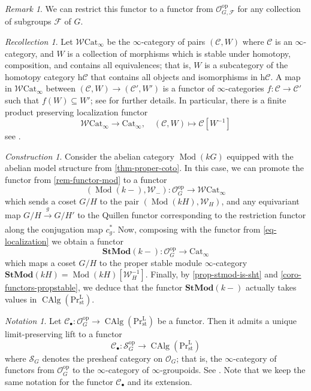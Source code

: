 \documentclass{amsart}
\newcommand{\nameop}{\operatorname{op}\nolimits}
\def \C{{\mathcal C}}
\def \F{{\mathcal F}}
\def \O{{\mathcal O}}
\def \S{{\mathcal S}}
\def \W{{\mathcal W}}
\def \PrL{\mathrm{Pr}^{\mathrm{L}}_{\mathrm{st}}}
\DeclareMathOperator{\Mod}{Mod}
\DeclareMathOperator{\CAlg}{CAlg}
\numberwithin{equation}{section}%
\theoremstyle{remark}
\newtheorem{remark}[equation]{Remark}
\newtheorem{recollection}[equation]{Recollection}
\newtheorem{notation}[equation]{Notation}
\newtheorem{construction}[equation]{Construction}
\begin{document}
{\begin{remark}
    We can restrict this functor to a functor from $\O_{G,\F}^{\nameop}$ for any collection of subgroups $\F$ of $G$.
\end{remark}

\begin{recollection}
    Let $\W\mathrm{Cat}_\infty $  be the   $\infty$-category of pairs $(\C, W)$ where $\C$ is an $\infty$-category, and $W$ is a collection of morphisms which is stable under homotopy, composition, and contains all equivalences; that is, $W$ is a subcategory of the homotopy category  $\mathrm{h}\C$ that contains all objects and isomorphisms in $\mathrm{h}\C$. A map in $\W\mathrm{Cat}_\infty$ between $(\C, W) \to (\C', W')$ is a functor of $\infty$-categories $f\colon \C \to \C'$ such that $f(W)\subseteq W'$; see \cite[Construction 4.1.7.1]{Lur17} for further details. 
   In particular, there is a finite product preserving localization functor 
    \begin{equation}\label{eq-localization}
   \W\mathrm{Cat}_\infty \to \mathrm{Cat}_\infty, \quad (\C,W)\mapsto \C[W^{-1}]
    \end{equation}
    see  \cite[Proposition 4.1.7.2]{Lur17}.
\end{recollection}

\begin{construction}\label{const-stmod-functor}
    Consider the abelian category $\Mod(kG)$ equipped with the abelian model structure from \cref{thm-proper-coto}. In this case, we can promote the functor from \cref{rem-functor-mod} to a functor 
     \[
    (\Mod(k-), \W_{-}) \colon \O_G^{\nameop} \to \W\mathrm{Cat}_\infty 
    \]
    which sends a coset $G/H$ to the pair $(\Mod(kH),\W_{H})$, and any equivariant map $G/H\xrightarrow[]{g} G/H' $ to the Quillen functor corresponding to the restriction functor along the conjugation map $c^\ast_g$. Now, composing with the functor from \cref{eq-localization} we obtain a functor 
     \[
    \mathbf{StMod}(k-) \colon \O_G^{\nameop} \to \mathrm{Cat}_\infty 
    \] 
    which maps a coset $G/H$ to the proper stable module $\infty$-category $\mathbf{StMod}(kH)=\Mod(kH)[\W_{H}^{-1}]$.  Finally,  by \cref{prop-stmod-is-sht} and \cref{coro-functors-propstable},  we deduce that the functor $\mathbf{StMod}(k-)$ actually takes values in $\CAlg(\PrL)$. 
\end{construction}


\begin{notation}\label{notation-orb}
    Let $\C_\bullet\colon \O_G^{\nameop}\to \CAlg(\PrL)$ be a functor. Then it admits a unique limit-preserving lift to a functor 
    \[
   \C_\bullet\colon \S_{G}^{\nameop} \to \CAlg(\PrL)
    \]
    where $\S_G$ denotes the presheaf category on $\O_G$; that is, the $\infty$-category of functors from $\O_G^{\mathrm{op}}$ to the $\infty$-category of $\infty$-groupoids. See \cite[Remark 5.3.5.9]{Lur09}.  Note that we keep the same notation for the functor $\C_\bullet$ and its extension. 
\end{notation} 


}
\end{document}
